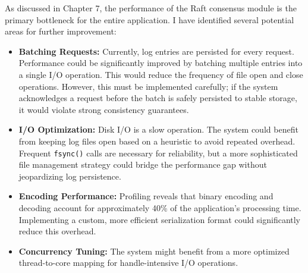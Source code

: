 \documentclass[shortabstract]{iithesis}
\begin{document}
As discussed in Chapter 7, the performance of the Raft consensus module is the primary bottleneck for the entire application. I have identified several potential areas for further improvement:
\begin{itemize}
    \item \textbf{Batching Requests:} Currently, log entries are persisted for every request. Performance could be significantly improved by batching multiple entries into a single I/O operation. This would reduce the frequency of file open and close operations. However, this must be implemented carefully; if the system acknowledges a request before the batch is safely persisted to stable storage, it would violate strong consistency guarantees.
    \item \textbf{I/O Optimization:} Disk I/O is a slow operation. The system could benefit from keeping log files open based on a heuristic to avoid repeated overhead. Frequent \texttt{fsync()} calls are necessary for reliability, but a more sophisticated file management strategy could bridge the performance gap without jeopardizing log persistence.
    \item \textbf{Encoding Performance:} Profiling reveals that binary encoding and decoding account for approximately 40\% of the application's processing time. Implementing a custom, more efficient serialization format could significantly reduce this overhead.
    \item \textbf{Concurrency Tuning:} The system might benefit from a more optimized thread-to-core mapping for handle-intensive I/O operations.
\end{itemize}


\end{document}
